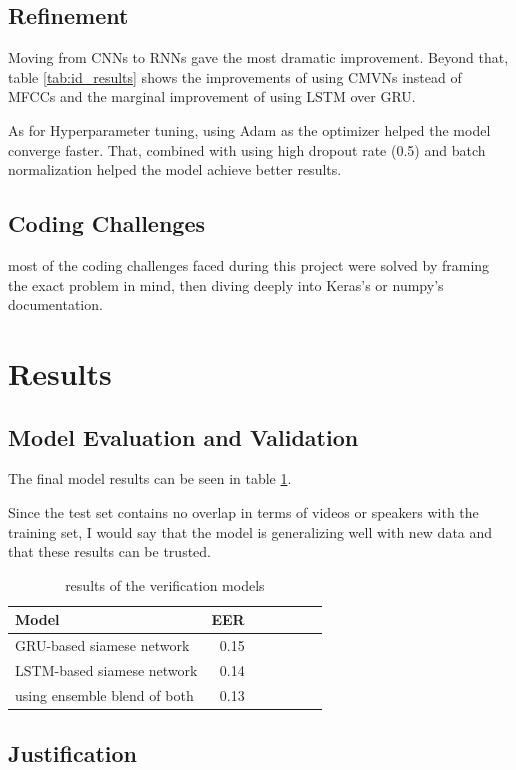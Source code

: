 \documentclass{article}
\begin{document}
\subsection{Refinement}
Moving from CNNs to RNNs gave the most dramatic improvement. Beyond that, table \ref{tab:id_results} shows the improvements of using CMVNs instead of MFCCs and the marginal improvement of using LSTM over GRU.

As for Hyperparameter tuning, using Adam as the optimizer helped the model converge faster. That, combined with using high dropout rate (0.5) and batch normalization helped the model achieve better results.

\subsection{Coding Challenges}
most of the coding challenges faced during this project were solved by framing the exact problem in mind, then diving deeply into Keras's\cite{chollet2015keras} or numpy's documentation.
\section{Results}
\subsection{Model Evaluation and Validation}
The final model results can be seen in table \ref{tab:ver_results}.

Since the test set contains no overlap in terms of videos or speakers with the training set, I would say that the model is generalizing well with new data and that these results can be trusted.
\begin{table}[H]
    \centering
    \begin{tabular}{l*{6}r}
        Model & EER\\
        \hline
        GRU-based siamese network & 0.15  \\
        LSTM-based siamese network & 0.14  \\
        using ensemble blend of both & 0.13  \\
    \end{tabular}
    \caption{results of the verification models}
    \label{tab:ver_results}
\end{table}

\subsection{Justification}
\end{document}
